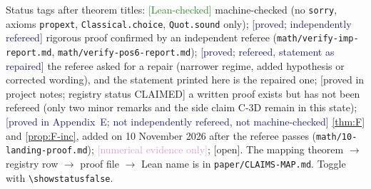 \documentclass[11pt]{article}
\theoremstyle{plain}
\theoremstyle{definition}
\theoremstyle{remark}
\begin{document}
\begin{tcolorbox}[colback=gray!5,colframe=gray!60,title={\sffamily Internal draft conventions (remove before submission)}]
\small Status tags after theorem titles:
\textcolor{ForestGreen}{\textsf{[Lean-checked]}} machine-checked (no \texttt{sorry}, axioms
\texttt{propext}, \texttt{Classical.choice}, \texttt{Quot.sound} only);
\textcolor{MidnightBlue}{\textsf{[proved; independently refereed]}} rigorous proof confirmed by an independent referee
(\texttt{math/verify-imp-report.md}, \texttt{math/verify-pos6-report.md});
\textcolor{MidnightBlue}{\textsf{[proved; refereed, statement as repaired]}} the referee asked for a repair (narrower regime,
added hypothesis or corrected wording), and the statement printed here is the repaired one;
\textcolor{BurntOrange}{\textsf{[proved in project notes; registry status CLAIMED]}} a written proof exists but has not been
refereed (only two minor remarks and the side claim C-3D remain in this state);
\textcolor{MidnightBlue}{\textsf{[proved in Appendix~E; not independently refereed, not machine-checked]}} \cref{thm:F} and
\cref{prop:F-inc}, added on 10 November 2026 after the referee passes (\texttt{math/10-landing-proof.md});
\textcolor{Plum}{\textsf{[numerical evidence only]}}; \textcolor{BrickRed}{\textsf{[open]}}.
The mapping theorem $\to$ registry row $\to$ proof file $\to$ Lean name is in \texttt{paper/CLAIMS-MAP.md}.
Toggle with \texttt{\textbackslash showstatusfalse}.
\end{tcolorbox}
\fi\fi













\appendix





\end{document}
